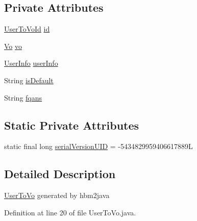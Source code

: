 \subsection*{Private Attributes}
\begin{DoxyCompactItemize}
\item 
\hyperlink{classportal_1_1registration_1_1domain_1_1UserToVoId}{UserToVoId} \hyperlink{classportal_1_1registration_1_1domain_1_1UserToVo_a246bd26e853d70c296f69df06aacea00}{id}
\item 
\hyperlink{classportal_1_1registration_1_1domain_1_1Vo}{Vo} \hyperlink{classportal_1_1registration_1_1domain_1_1UserToVo_ad229709d89c14b6517530399c1c5c1e8}{vo}
\item 
\hyperlink{classportal_1_1registration_1_1domain_1_1UserInfo}{UserInfo} \hyperlink{classportal_1_1registration_1_1domain_1_1UserToVo_a9584de18496e8a8c2105ece810c4452a}{userInfo}
\item 
String \hyperlink{classportal_1_1registration_1_1domain_1_1UserToVo_a27cc1b5973f31bc34b6710a0c33243d2}{isDefault}
\item 
String \hyperlink{classportal_1_1registration_1_1domain_1_1UserToVo_a77009c03c4ac817e12c5d470fdd2695e}{fqans}
\end{DoxyCompactItemize}
\subsection*{Static Private Attributes}
\begin{DoxyCompactItemize}
\item 
static final long \hyperlink{classportal_1_1registration_1_1domain_1_1UserToVo_a35d5b34b5032388d5ce601ff51b0d6b2}{serialVersionUID} = -\/5434829959406617889L
\end{DoxyCompactItemize}


\subsection{Detailed Description}
\hyperlink{classportal_1_1registration_1_1domain_1_1UserToVo}{UserToVo} generated by hbm2java 

Definition at line 20 of file UserToVo.java.



